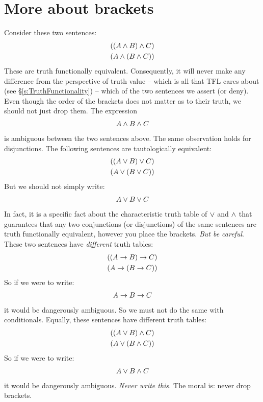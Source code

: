 \section{More about brackets}\label{s:MoreBracketingConventions}
Consider these two sentences:
	\begin{align*}
		((A \wedge B) \wedge C)\\
		(A \wedge (B \wedge C))
	\end{align*}
These are truth functionally equivalent. Consequently, it will never make any difference from the perspective of truth value -- which is all that TFL cares about (see \S\ref{s:TruthFunctionality}) -- which of the two sentences we assert (or deny). Even though the order of the brackets does not matter as to their truth, we should not just drop them. The expression
	\begin{align*}
		A \wedge B \wedge C
	\end{align*}
is ambiguous between the two sentences above.  The same observation holds for disjunctions. The following sentences are tautologically equivalent:
	\begin{align*}
		((A \vee B) \vee C)\\
		(A \vee (B \vee C))
	\end{align*}
But we should not simply write:
	\begin{align*}
		A \vee B \vee C
	\end{align*}
In fact, it is a specific fact about the characteristic truth table of $\vee$ and $\wedge$ that guarantees that any two conjunctions (or disjunctions) of the same sentences are truth functionally equivalent, however you place the brackets. \emph{But be careful}. These two sentences have \emph{different} truth tables:
	\begin{align*}
		((A \rightarrow B) \rightarrow C)\\
		(A \rightarrow (B \rightarrow C))
	\end{align*}
So if we were to write:
	\begin{align*}
		A \rightarrow B \rightarrow C
	\end{align*}
it would be dangerously ambiguous. So we must not do the same with conditionals. Equally, these sentences have different truth tables:
	\begin{align*}
		((A \vee B) \wedge C)\\
		(A \vee (B \wedge C))
	\end{align*}
So if we were to write:
	\begin{align*}
		A \vee B \wedge C
	\end{align*}
it would be dangerously ambiguous. \emph{Never write this.} The moral is: never drop brackets.

